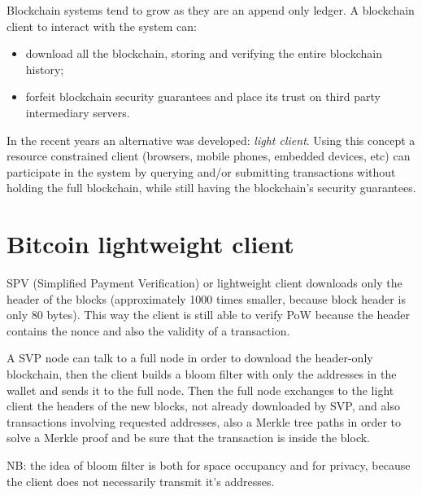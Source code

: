 Blockchain systems tend to grow as they are an append only ledger.
A blockchain client to interact with the system can:
\begin{itemize}
    \item download all the blockchain, storing and verifying the entire blockchain history;
    \item forfeit blockchain security guarantees and place its trust on third party intermediary servers.
\end{itemize}
In the recent years an alternative was developed: \emph{light client}.
Using this concept a resource constrained client (browsers, mobile phones, embedded devices, etc) can participate in the system by querying and/or submitting transactions without holding the full blockchain, while still having the blockchain's security guarantees.

\section{Bitcoin lightweight client}
SPV (Simplified Payment Verification) or lightweight client downloads only the header of the blocks (approximately 1000 times smaller, because block header is only 80 bytes).
This way the client is still able to verify PoW because the header contains the nonce and also the validity of a transaction.

A SVP node can talk to a full node in order to download the header-only blockchain, then the client builds a bloom filter with only the addresses in the wallet and sends it to the full node.
Then the full node exchanges to the light client the headers of the new blocks, not already downloaded by SVP, and also transactions involving requested addresses, also a Merkle tree paths in order to solve a Merkle proof and be sure that the transaction is inside the block.

NB: the idea of bloom filter is both for space occupancy and for privacy, because the client does not necessarily transmit it's addresses.





